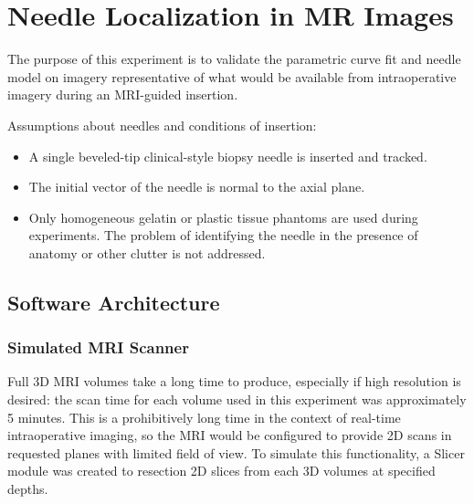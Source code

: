 %
%
%


\chapter{Needle Localization in MR Images}
\label{sec:mritracking} %

The purpose of this experiment is to validate the parametric curve fit and needle model on imagery representative of what would be available from intraoperative imagery during an MRI-guided insertion.

Assumptions about needles and conditions of insertion:
\begin{itemize}
\item A single beveled-tip clinical-style biopsy needle is inserted and tracked.
\item The initial vector of the needle is normal to the axial plane.
\item Only homogeneous gelatin or plastic tissue phantoms are used during experiments. The problem of identifying the needle in the presence of anatomy or other clutter is not addressed.
\end{itemize}

\section{Software Architecture}
\subsection{Simulated MRI Scanner}
Full 3D MRI volumes take a long time to produce, especially if high resolution is desired: the scan time for each volume used in this experiment was approximately 5 minutes. This is a prohibitively long time in the context of real-time intraoperative imaging, so the MRI would be configured to provide 2D scans in requested planes with limited field of view. To simulate this functionality, a  Slicer module was created to resection 2D slices from each 3D volumes at specified depths.


